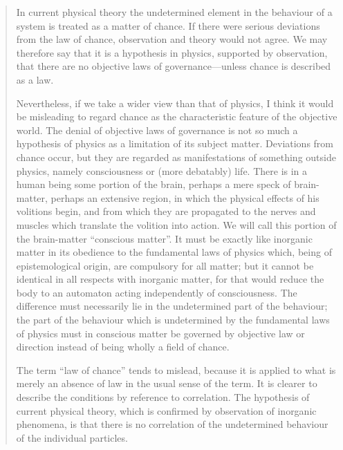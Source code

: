 \begin{quote}
    In current physical theory the undetermined element in the behaviour of a system is treated as a matter of chance.  If there were serious deviations from the law of chance, observation and theory would not agree.  We may therefore say that it is a hypothesis in physics, supported by observation, that there are no objective laws of governance---unless chance is described as a law.

    Nevertheless, if we take a wider view than that of physics, I think it would be misleading to regard chance as the characteristic feature of the objective world.  The denial of objective laws of governance is not so much a hypothesis of physics as a limitation of its subject matter.  Deviations from chance occur, but they are regarded as manifestations of something outside physics, namely consciousness or (more debatably) life.  There is in a human being some portion of the brain, perhaps a mere speck of brain-matter, perhaps an extensive region, in which the physical effects of his volitions begin, and from which they are propagated to the nerves and muscles which translate the volition into action.  We will call this portion of the brain-matter ``conscious matter''.  It must be exactly like inorganic matter in its obedience to the fundamental laws of physics which, being of epistemological origin, are compulsory for all matter; but it cannot be identical in all respects with inorganic matter, for that would reduce the body to an automaton acting independently of consciousness.  The difference must necessarily lie in the undetermined part of the behaviour; the part of the behaviour which is undetermined by the fundamental laws of physics must in conscious matter be governed by objective law or direction instead of being wholly a field of chance.  

    The term ``law of chance'' tends to mislead, because it is applied to what is merely an absence of law in the usual sense of the term.  It is clearer to describe the conditions by reference to correlation.  The hypothesis of current physical theory, which is confirmed by observation of inorganic phenomena, is that there is no correlation of the undetermined behaviour of the individual particles.  


\end{quote}
